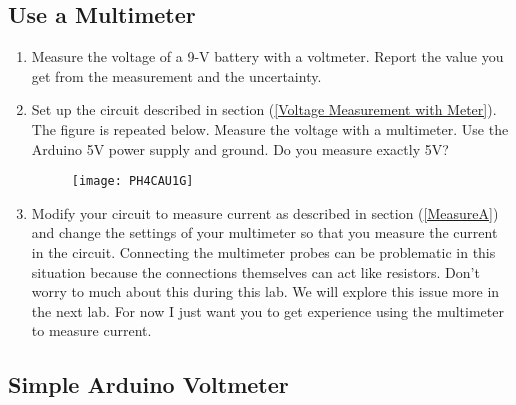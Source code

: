 
\subsection{Use a Multimeter}

\begin{enumerate}
	\item Measure the voltage of a 9-V battery with a voltmeter. Report the
	value you get from the measurement and the uncertainty.
	
	\item Set up the circuit described in section (\ref{Voltage Measurement with
		Meter}). The figure is repeated below. Measure the voltage with a
	multimeter. Use the Arduino 5V power supply and ground. Do you measure exactly 5V?
	\begin{figure}[h!]
		\texttt{[image: PH4CAU1G]}
	\end{figure}
	
	\item Modify your circuit to measure current as described in section (\ref{MeasureA}) and change the settings of your multimeter so that you measure the current in the circuit. Connecting the multimeter probes can be problematic in this situation because the connections themselves can act like resistors. Don't worry to much about this during this lab. We will explore this issue more in the next lab. For now I just want you to get experience using the multimeter to measure current. 
\end{enumerate}


\subsection{Simple Arduino Voltmeter}

